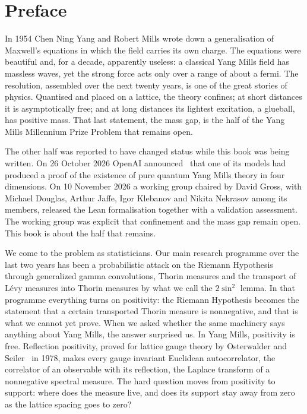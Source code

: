 \chapter*{Preface}

In 1954 Chen Ning Yang and Robert Mills wrote down a generalisation of Maxwell's equations in which the field carries its own charge. The equations were beautiful and, for a decade, apparently useless: a classical Yang Mills field has massless waves, yet the strong force acts only over a range of about a fermi. The resolution, assembled over the next twenty years, is one of the great stories of physics. Quantised and placed on a lattice, the theory confines; at short distances it is asymptotically free; and at long distances its lightest excitation, a glueball, has positive mass. That last statement, the mass gap, is the half of the Yang Mills Millennium Prize Problem that remains open.

The other half was reported to have changed status while this book was being written. On 26 October 2026 OpenAI announced~\cite{OAI} that one of its models had produced a proof of the existence of pure quantum Yang Mills theory in four dimensions. On 10 November 2026 a working group chaired by David Gross, with Michael Douglas, Arthur Jaffe, Igor Klebanov and Nikita Nekrasov among its members, released the Lean formalisation together with a validation assessment. The working group was explicit that confinement and the mass gap remain open. This book is about the half that remains.

We come to the problem as statisticians. Our main research programme over the last two years has been a probabilistic attack on the Riemann Hypothesis through generalized gamma convolutions, Thorin measures and the transport of L\'evy measures into Thorin measures by what we call the $2\sin^2$ lemma. In that programme everything turns on positivity: the Riemann Hypothesis becomes the statement that a certain transported Thorin measure is nonnegative, and that is what we cannot yet prove. When we asked whether the same machinery says anything about Yang Mills, the answer surprised us. In Yang Mills, positivity is free. Reflection positivity, proved for lattice gauge theory by Osterwalder and Seiler~\cite{OSe} in 1978, makes every gauge invariant Euclidean autocorrelator, the correlator of an observable with its reflection, the Laplace transform of a nonnegative spectral measure. The hard question moves from positivity to support: where does the measure live, and does its support stay away from zero as the lattice spacing goes to zero?

